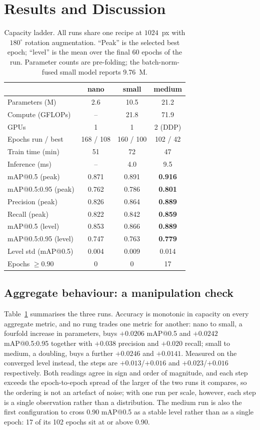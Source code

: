 \documentclass[conference]{IEEEtran}
\begin{document}
\section{Results and Discussion}
\label{sec:results}

\begin{table}[t]
\centering
\caption{Capacity ladder. All runs share one recipe at $1024$~px with
$180^\circ$ rotation augmentation. ``Peak'' is the selected best epoch;
``level'' is the mean over the final 60 epochs of the run. Parameter counts are
pre-folding; the batch-norm-fused small model reports 9.76~M.}
\label{tab:ladder}
\setlength{\tabcolsep}{4pt}
\begin{tabular}{@{}lccc@{}}
\toprule
 & nano & small & medium \\
\midrule
Parameters (M) & 2.6 & 10.5 & 21.2 \\
Compute (GFLOPs) & -- & 21.8 & 71.9 \\
GPUs & 1 & 1 & 2 (DDP) \\
Epochs run / best & 168 / 108 & 160 / 100 & 102 / 42 \\
Train time (min) & 51 & 72 & 47 \\
Inference (ms) & -- & 4.0 & 9.5 \\
\midrule
mAP@0.5 (peak) & 0.871 & 0.891 & \textbf{0.916} \\
mAP@0.5:0.95 (peak) & 0.762 & 0.786 & \textbf{0.801} \\
Precision (peak) & 0.826 & 0.864 & \textbf{0.889} \\
Recall (peak) & 0.822 & 0.842 & \textbf{0.859} \\
\midrule
mAP@0.5 (level) & 0.853 & 0.866 & \textbf{0.889} \\
mAP@0.5:0.95 (level) & 0.747 & 0.763 & \textbf{0.779} \\
Level std (mAP@0.5) & 0.004 & 0.009 & 0.014 \\
Epochs $\geq 0.90$ & 0 & 0 & 17 \\
\bottomrule
\end{tabular}
\end{table}

\subsection{Aggregate behaviour: a manipulation check}
Table~\ref{tab:ladder} summarises the three runs. Accuracy is monotonic in
capacity on every aggregate metric, and no rung trades one metric for another:
nano to small, a fourfold increase in parameters, buys $+0.0206$ mAP@0.5 and
$+0.0242$ mAP@0.5:0.95 together with $+0.038$ precision and $+0.020$ recall;
small to medium, a doubling, buys a further $+0.0246$ and $+0.0141$. Measured on
the converged level instead, the steps are $+0.013$/$+0.016$ and
$+0.023$/$+0.016$ respectively. Both readings agree in sign and order of
magnitude, and each step exceeds the epoch-to-epoch spread of the larger of the
two runs it compares, so the ordering is not an artefact of noise; with one run
per scale, however, each step is a single observation rather than a
distribution. The medium run is also the first configuration to cross 0.90
mAP@0.5 as a stable level rather than as a single epoch: 17 of its 102 epochs
sit at or above 0.90.
\end{document}
